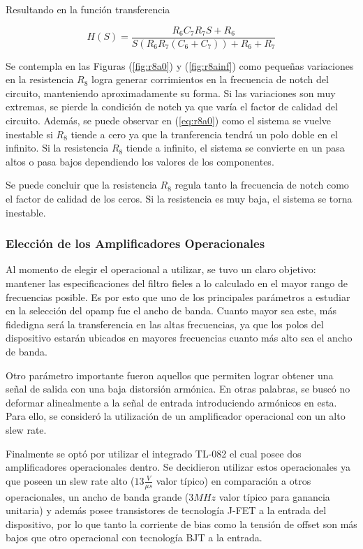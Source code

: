 Resultando en la función transferencia

\begin{equation}
H(S) = \frac{R_6 C_7 R_7 S + R_6 }{S (R_6 R_7 (C_6 + C_7)) + R_6 + R_7}
\end{equation}

Se contempla en las Figuras (\ref{fig:r8a0}) y (\ref{fig:r8ainf}) como pequeñas variaciones en la resistencia $R_8$ logra generar corrimientos en la frecuencia de notch del circuito, manteniendo aproximadamente su forma. Si las variaciones son muy extremas, se pierde la condición de notch ya que varía el factor de calidad del circuito. Además, se puede observar en (\ref{eq:r8a0}) como el sistema se vuelve inestable si $R_8$ tiende a cero ya que la tranferencia tendrá un polo doble en el infinito. Si la resistencia $R_8$ tiende a infinito, el sistema se convierte en un pasa altos o pasa bajos dependiendo los valores de los componentes.

Se puede concluir que la resistencia $R_8$ regula tanto la frecuencia de notch como el factor de calidad de los ceros. Si la resistencia es muy baja, el sistema se torna inestable.

\subsubsection{Elección de los Amplificadores Operacionales}

Al momento de elegir el operacional a utilizar, se tuvo un claro objetivo: mantener las especificaciones del filtro fieles a lo calculado en el mayor rango de frecuencias posible. Es por esto que uno de los principales parámetros a estudiar en la selección del opamp fue el ancho de banda. Cuanto mayor sea este, más fidedigna será la transferencia en las altas frecuencias, ya que los polos del dispositivo estarán ubicados en mayores frecuencias cuanto más alto sea el ancho de banda.

Otro parámetro importante fueron aquellos que permiten lograr obtener una señal de salida con una baja distorsión armónica. En otras palabras, se buscó no deformar alinealmente a la señal de entrada introduciendo armónicos en esta. Para ello, se consideró la utilización de un amplificador operacional con un alto slew rate.

Finalmente se optó por utilizar el integrado TL-082 el cual posee dos amplificadores operacionales dentro. Se decidieron utilizar estos operacionales ya que poseen un slew rate alto ($13\frac{V}{\mu s}$ valor típico) en comparación a otros operacionales, un ancho de banda grande ($3MHz$ valor típico para ganancia unitaria) y además posee transistores de tecnología J-FET a la entrada del dispositivo, por lo que tanto la corriente de bias como la tensión de offset son más bajos que otro operacional con tecnología BJT a la entrada.

